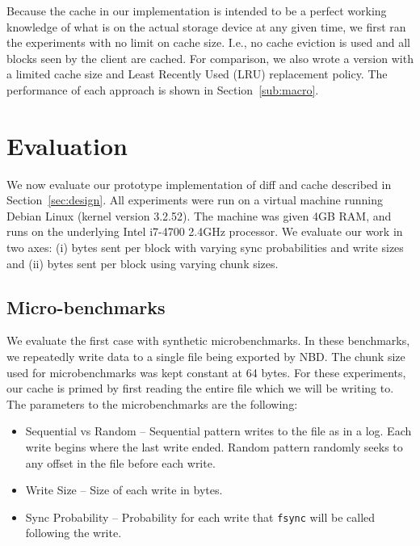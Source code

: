 \documentclass[10pt,twocolumn]{article}
\begin{document}
Because the cache in our implementation is intended to be a perfect working 
knowledge of what is on the actual storage device at any given time, we first
ran the experiments with no limit on cache size. %
I.e., no cache eviction is used and all blocks seen by the client are cached. %
For comparison, we also wrote a version with a limited cache size and Least
Recently Used (LRU) replacement policy. %
The performance of each approach is shown in Section~\ref{sub:macro}. %

\section{Evaluation}
\label{sec:evaluation}

We now evaluate our prototype implementation of diff and cache described in
Section~\ref{sec:design}. %
All experiments were run on a virtual machine running Debian Linux (kernel version
3.2.52). %
The machine was given 4GB RAM, and runs on the underlying Intel i7-4700 2.4GHz
processor. %
We evaluate our work in two axes: (i) bytes sent per block with varying sync
probabilities and write sizes and (ii) bytes sent per block using varying chunk
sizes. %

\subsection{Micro-benchmarks}

We evaluate the first case with synthetic microbenchmarks. %
In these benchmarks, we repeatedly write data to a single file being exported by
NBD. %
The chunk size used for microbenchmarks was kept constant at 64 bytes. %
For these experiments, our cache is primed by first reading the entire file
which we will be writing to. %
The parameters to the microbenchmarks are the following:

\begin{itemize}
  \item Sequential vs Random -- Sequential pattern writes to the file as in a log.
  Each write begins where the last write ended. Random pattern randomly seeks to
  any offset in the file before each write.
  \item Write Size -- Size of each write in bytes.
  \item Sync Probability -- Probability for each write that \texttt{fsync} will be
  called following the write.
\end{itemize}
\end{document}
